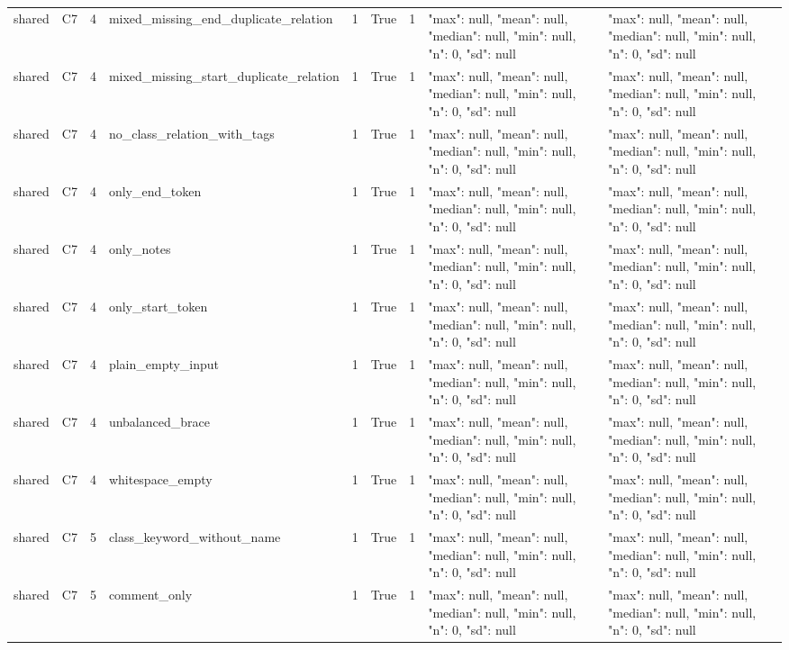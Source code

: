 \begin{tabular}{lllllllll}
shared & C7 & 4 & mixed\_missing\_end\_duplicate\_relation & 1 & True & 1 & {"max": null, "mean": null, "median": null, "min": null, "n": 0, "sd": null} & {"max": null, "mean": null, "median": null, "min": null, "n": 0, "sd": null} \\
shared & C7 & 4 & mixed\_missing\_start\_duplicate\_relation & 1 & True & 1 & {"max": null, "mean": null, "median": null, "min": null, "n": 0, "sd": null} & {"max": null, "mean": null, "median": null, "min": null, "n": 0, "sd": null} \\
shared & C7 & 4 & no\_class\_relation\_with\_tags & 1 & True & 1 & {"max": null, "mean": null, "median": null, "min": null, "n": 0, "sd": null} & {"max": null, "mean": null, "median": null, "min": null, "n": 0, "sd": null} \\
shared & C7 & 4 & only\_end\_token & 1 & True & 1 & {"max": null, "mean": null, "median": null, "min": null, "n": 0, "sd": null} & {"max": null, "mean": null, "median": null, "min": null, "n": 0, "sd": null} \\
shared & C7 & 4 & only\_notes & 1 & True & 1 & {"max": null, "mean": null, "median": null, "min": null, "n": 0, "sd": null} & {"max": null, "mean": null, "median": null, "min": null, "n": 0, "sd": null} \\
shared & C7 & 4 & only\_start\_token & 1 & True & 1 & {"max": null, "mean": null, "median": null, "min": null, "n": 0, "sd": null} & {"max": null, "mean": null, "median": null, "min": null, "n": 0, "sd": null} \\
shared & C7 & 4 & plain\_empty\_input & 1 & True & 1 & {"max": null, "mean": null, "median": null, "min": null, "n": 0, "sd": null} & {"max": null, "mean": null, "median": null, "min": null, "n": 0, "sd": null} \\
shared & C7 & 4 & unbalanced\_brace & 1 & True & 1 & {"max": null, "mean": null, "median": null, "min": null, "n": 0, "sd": null} & {"max": null, "mean": null, "median": null, "min": null, "n": 0, "sd": null} \\
shared & C7 & 4 & whitespace\_empty & 1 & True & 1 & {"max": null, "mean": null, "median": null, "min": null, "n": 0, "sd": null} & {"max": null, "mean": null, "median": null, "min": null, "n": 0, "sd": null} \\
shared & C7 & 5 & class\_keyword\_without\_name & 1 & True & 1 & {"max": null, "mean": null, "median": null, "min": null, "n": 0, "sd": null} & {"max": null, "mean": null, "median": null, "min": null, "n": 0, "sd": null} \\
shared & C7 & 5 & comment\_only & 1 & True & 1 & {"max": null, "mean": null, "median": null, "min": null, "n": 0, "sd": null} & {"max": null, "mean": null, "median": null, "min": null, "n": 0, "sd": null} \\

\end{tabular}
